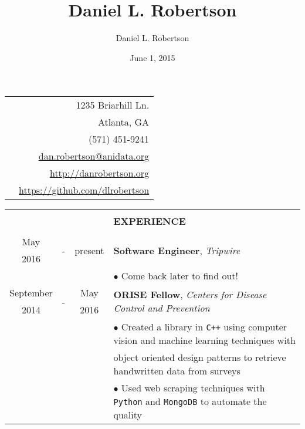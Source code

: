 \documentclass[10pt]{article}
\title{Daniel L. Robertson}
\date{June 1, 2015}
\author{Daniel L. Robertson}
\begin{document}
    \normalfont
    \begin{table}[ht]
        \begin{tabular}{p{13cm}r}
            \multirow{5}{*}{\hspace*{1cm}\color{maroon}{\huge\textbf{Daniel L. Robertson}}} & 1235 Briarhill Ln.\\
            & Atlanta, GA\\
            & (571) 451-9241\\
            & \href{mailto:dan.robertson@anidata.org}{dan.robertson@anidata.org}\\
            & \href{http://danrobertson.org}{http://danrobertson.org}\\
            & \href{https://github.com/dlrobertson}{https://github.com/dlrobertson}\\
        \end{tabular}
        \begin{tabular}{@{\hspace{0mm}}c@{\hspace{1mm}}c@{\hspace{3mm}}cl}
            & & & \color{maroon}{\rule{14cm}{0.75pt}}\\
            & & & \large{\textbf{EXPERIENCE}}\\[-2mm]
            & & & \color{maroon}{\rule{14cm}{0.75pt}}\\
            May & \multirow{2}{*}{-} & \multirow{2}{*}{present} & \multirow{2}{*}{\textbf{Software Engineer}, \textit{Tripwire}}\\
            2016 & & &\\
            & & & $\bullet$ Come back later to find out!\\
            September & \multirow{2}{*}{-} & May & \multirow{2}{*}{\textbf{ORISE Fellow}, \textit{Centers for Disease Control and Prevention}}\\
            2014 & & 2016 &\\
            & & & $\bullet$ Created a library in \texttt{C++} using computer vision and machine learning techniques with\\
            & & & \hspace*{4mm}object oriented design patterns to retrieve handwritten data from surveys\\
            & & & $\bullet$ Used web scraping techniques with \texttt{Python} and \texttt{MongoDB} to automate the quality\\

\end{tabular}
\end{table}
\end{document}
